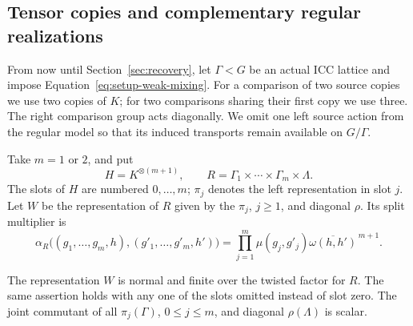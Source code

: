 \subsection{Tensor copies and complementary regular realizations}

From now until Section~\ref{sec:recovery}, let $\Gamma<G$ be an
actual ICC lattice and impose Equation~\eqref{eq:setup-weak-mixing}.
For a comparison of two source copies we use two copies of $K$; for
two comparisons sharing their first copy we use three. The right
comparison group acts diagonally. We omit one left source action from
the regular model so that its induced transports remain available on
$G/\Gamma$.


Take $m=1$ or $2$, and put
\[
 H=K^{\otimes(m+1)},\qquad
 R=\Gamma_1\times\cdots\times\Gamma_m\times\Lambda.
\]
The slots of $H$ are numbered $0,\ldots,m$; $\pi_j$ denotes the
left representation in slot $j$.  Let $W$ be the representation of
$R$ given by the $\pi_j$, $j\geq1$, and diagonal $\rho$.  Its split
multiplier is
\begin{equation}
 \alpha_R\bigl((g_1,\ldots,g_m,h),(g'_1,\ldots,g'_m,h')\bigr)
   =\prod_{j=1}^m\mu(g_j,g'_j)
        \overline{\omega(h,h')}^{\,m+1}.
 \label{eq:setup-tensor-multiplier}
\end{equation}

\begin{lemma}
\label{lem:setup-normal-tensors}
The representation $W$ is normal and finite over the twisted factor
for $R$.  The same assertion holds with any one of the slots omitted
instead of slot zero.  The joint commutant of all $\pi_j(\Gamma)$,
$0\leq j\leq m$, and diagonal $\rho(\Lambda)$ is scalar.
\end{lemma}

